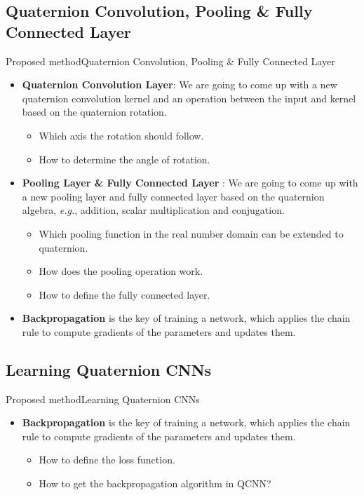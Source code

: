 \documentclass{beamer}
\begin{document}
\subsection{Quaternion Convolution, Pooling \& Fully Connected Layer}
\begin{frame}{Proposed method}{Quaternion Convolution, Pooling \& Fully Connected Layer}
    \begin{itemize}
        \item \textbf{Quaternion Convolution Layer}: We are going to come up with a new quaternion convolution kernel and an operation between the input and kernel based on the quaternion rotation.\begin{itemize}
            \item Which axis the rotation should follow.
            \item How to determine the angle of rotation.
        \end{itemize}
        \item \textbf{Pooling Layer \& Fully Connected Layer }: We are going to come up with a new pooling layer and fully connected layer based on the quaternion algebra, \emph{e.g.}, addition, scalar multiplication and conjugation.
            \begin{itemize}
                \item Which pooling function in the real number domain can be extended to quaternion.
                \item How does the pooling operation work.
                \item How to define the fully connected layer.
            \end{itemize}
        \item \textbf{Backpropagation} is the key of training a network, which applies the chain rule to compute gradients of the parameters and updates them.
    \end{itemize}
\end{frame}
\subsection{Learning Quaternion CNNs}
\begin{frame}{Proposed method}{Learning Quaternion CNNs}
    \begin{itemize}
        \item \textbf{Backpropagation} is the key of training a network, which applies the chain rule to compute gradients of the parameters and updates them.
        \begin{itemize}
            \item How to define the loss function.
            \item How to get the backpropagation algorithm in QCNN?
        \end{itemize}
    \end{itemize}
\end{frame}
\end{document}
